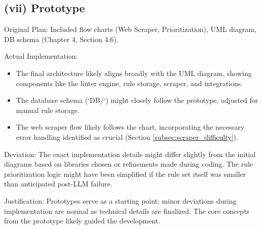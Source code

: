 \subsection{(vii) Prototype}
Original Plan: Included flow charts (Web Scraper, Prioritization), UML diagram, DB schema (Chapter 4, Section 4.6).

Actual Implementation:
\begin{itemize}
    \item The final architecture likely aligns broadly with the UML diagram, showing components like the linter engine, rule storage, scraper, and integrations.
    \item The database schema (`DB/`) might closely follow the prototype, adjusted for manual rule storage.
    \item The web scraper flow likely follows the chart, incorporating the necessary error handling identified as crucial (Section \ref{subsec:scraper_difficulty}).
\end{itemize}
Deviation: The exact implementation details might differ slightly from the initial diagrams based on libraries chosen or refinements made during coding. The rule prioritization logic might have been simplified if the rule set itself was smaller than anticipated post-LLM failure.

Justification: Prototypes serve as a starting point; minor deviations during implementation are normal as technical details are finalized. The core concepts from the prototype likely guided the development.